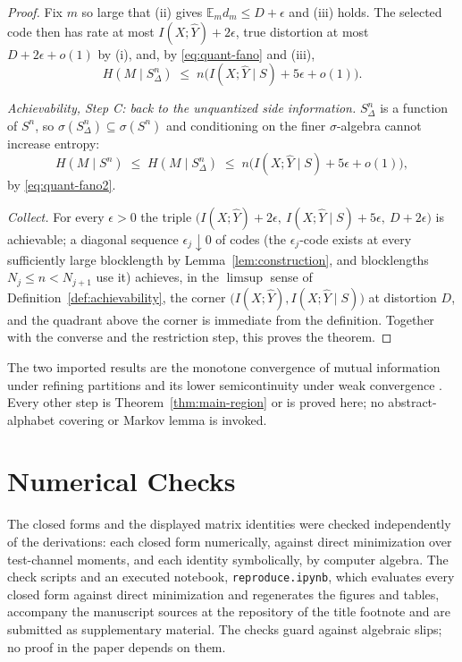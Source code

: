 \documentclass[11pt,onecolumn]{IEEEtran}
\newcommand{\E}{\mathbb{E}}
\newcommand{\hY}{\widehat{Y}}
\begin{document}
\begin{proof}
Fix $m$ so large that (ii) gives $\E_m d_m\le D+\epsilon$ and (iii)
holds. The selected code then has rate at most $I(X;\hY)+2\epsilon$,
true distortion at most $D+2\epsilon+o(1)$ by (i), and, by
\eqref{eq:quant-fano} and (iii),
\begin{equation}
H(M\mid S_\Delta^n)\;\le\;n\bigl(I(X;\hY\mid S)+5\epsilon+o(1)\bigr).
\label{eq:quant-fano2}
\end{equation}

\emph{Achievability, Step C: back to the unquantized side information.}
$S_\Delta^n$ is a function of $S^n$, so
$\sigma(S_\Delta^n)\subseteq\sigma(S^n)$ and conditioning on the finer
$\sigma$-algebra cannot increase entropy:
\begin{equation}
H(M\mid S^n)\;\le\;H(M\mid S_\Delta^n)
\;\le\;n\bigl(I(X;\hY\mid S)+5\epsilon+o(1)\bigr),
\label{eq:quant-back}
\end{equation}
by \eqref{eq:quant-fano2}.

\emph{Collect.} For every $\epsilon>0$ the triple
$\bigl(I(X;\hY)+2\epsilon,\ I(X;\hY\mid S)+5\epsilon,\
D+2\epsilon\bigr)$ is achievable; a diagonal sequence
$\epsilon_j\downarrow0$ of codes (the $\epsilon_j$-code exists at every
sufficiently large blocklength by Lemma~\ref{lem:construction}, and
blocklengths $N_j\le n<N_{j+1}$ use it) achieves, in the $\limsup$ sense
of Definition~\ref{def:achievability}, the corner
$\bigl(I(X;\hY),I(X;\hY\mid S)\bigr)$ at distortion $D$, and the
quadrant above the corner is immediate from the definition. Together
with the converse and the restriction step, this proves the theorem.
\end{proof}

The two imported results are the monotone convergence of mutual
information under refining partitions \cite[Ch.~2]{pinsker1964} and its
lower semicontinuity under weak convergence \cite{posner1975}. Every
other step is Theorem~\ref{thm:main-region} or is proved here; no
abstract-alphabet covering or Markov lemma is invoked.

\section{Numerical Checks}
\label{app:numver}

The closed forms and the displayed matrix identities were checked
independently of the derivations: each closed form numerically, against
direct minimization over test-channel moments, and each identity
symbolically, by computer algebra. The check scripts and an executed
notebook, \texttt{reproduce.ipynb}, which evaluates every closed form
against direct minimization and regenerates the figures and tables,
accompany the manuscript sources at the repository of the title footnote
and are submitted as supplementary material. The checks guard against
algebraic slips; no proof in the paper depends on them.
\end{document}
